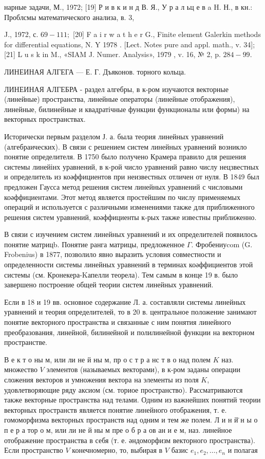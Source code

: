 \documentclass[10pt]{article}
\begin{document}
нарные задачи, М., 1972; [19] Р и в к и н д В. Я., У р а л ьц е в a H. Н., в кн.: Проблсмы математического анализа, в. 3,

J., 1972, с. $69-111 ;$ [20] F a i r w a t h e r G., Finite element Galerkin methods for differential equations, N. Y 1978 . [Lect. Notes pure and appl. math., v. 34]; [21] L u s k in M., «SIAM J. Numer. Analysis», 1979 , v. 16, № 2, p. $284-99$.



ЛИНЕИНАЯ АЛГЕГА — Е. Г. Дъяконов. торного кольца.



ЛИНЕИНАЯ АЛГЕБРА - раздел алгебры, в к-ром изучаются векторные (линейные) пространства, линейные операторы (линейные отображения), линейные, билинейные и квадратічные функции функционалы или формы) на векторных пространствах.



Исторически первым разделом Ј. а. была теория линейных уравнений (алгебраических). В связи с решением систем линейных уравнений возникло понятие определителя. В 1750 было получено Крамера правило для решения системы линейінх уравнений, в к-рой число уравнений равно числу нецзвестных и определитель из коәффициентов при неизвестных отличен от нуля. В 1849 был предложен Гаусса метод решения систем линейных уравнений с числовыми коәффициентами. Этот метод является простейшим по числу применяемых операций и используется с различными изменениями также для приближенного решения систем уравнений, коәффициенты к-рых также известны приближенно.



В связи с изучением систем линейных уравнений и их определителей появилось понятие матрицb. Понятие ранга матрицы, предложенное $\Gamma$. Фробениуcom (G. Frobenius) в 1877, позволило явно выразить условия совместности и определенности системы линейных уравнений в терминах коәффициентов этой системы (см. Кронекера-Kапелли теорела). Тем самым в конце 19 в. было завершено построение общей теории систем линейных уравнений.



Если в 18 и 19 вв. основное содержание Л. а. составляли системы линейных уравнений и теория определителей, то в 20 в. центральное положение занимают понятие векторного пространства и связанные с ним понятия линейного преобразования, линейной, билинейной и полилинейной функции на векторном пространстве.



В е к т о ны м, или ли не й ны м, пр о с т р а нс т в о над полем $K$ наз. множество $V$ элементов (называемых векторами), в к-ром заданы операции сложения векторов и умножения вектора на элементы из поля $K$, удовлетворяющие ряду аксиом (см. ториое пространство). Рассматриваются также векторные пространства над телами. Одним из важнейших понятий теории векторных пространств является понятие линейного отображения, т. е. гомоморфизма векторных пространств над одним и тем же полем. Л и н й̈ н ы о п е р а тор о м, или ли не й ны м пре о б р а ов ан и е м, наз. линейное отображение пространства в себя (т. е. әндоморфизм векторного пространства). Если пространство $V$ конечномерно, то, выбирая в $V$ базис $e_{1}, e_{2}, \ldots, e_{n}$ и полагая
\end{document}
